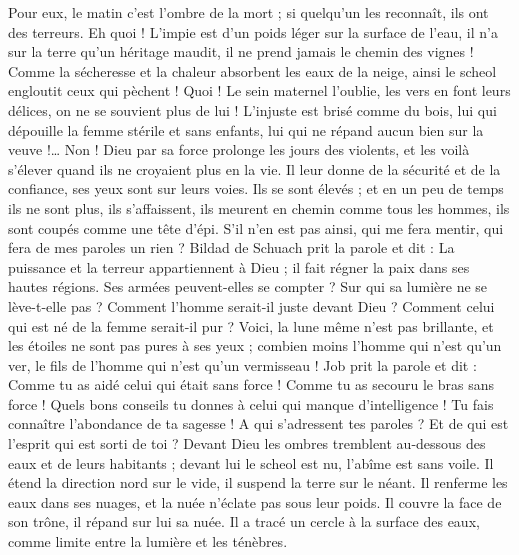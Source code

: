 \begin{multicols}{2}
Pour eux, le matin c'est l'ombre de la mort ; si quelqu'un les reconnaît, ils ont des terreurs.
Eh quoi ! L'impie est d'un poids léger sur la surface de l'eau, il n'a sur la terre qu'un héritage maudit, il ne prend jamais le chemin des vignes !
Comme la sécheresse et la chaleur absorbent les eaux de la neige, ainsi le scheol engloutit ceux qui pèchent !
Quoi ! Le sein maternel l'oublie, les vers en font leurs délices, on ne se souvient plus de lui ! L'injuste est brisé comme du bois,
lui qui dépouille la femme stérile et sans enfants, lui qui ne répand aucun bien sur la veuve !…
Non ! Dieu par sa force prolonge les jours des violents, et les voilà s'élever quand ils ne croyaient plus en la vie.
Il leur donne de la sécurité et de la confiance, ses yeux sont sur leurs voies.
Ils se sont élevés ; et en un peu de temps ils ne sont plus, ils s'affaissent, ils meurent en chemin comme tous les hommes, ils sont coupés comme une tête d'épi.
S'il n'en est pas ainsi, qui me fera mentir, qui fera de mes paroles un rien ?
\VerseOne{}Bildad de Schuach prit la parole et dit :
La puissance et la terreur appartiennent à Dieu ; il fait régner la paix dans ses hautes régions.
Ses armées peuvent-elles se compter ? Sur qui sa lumière ne se lève-t-elle pas ?
Comment l'homme serait-il juste devant Dieu ? Comment celui qui est né de la femme serait-il pur ?
Voici, la lune même n'est pas brillante, et les étoiles ne sont pas pures à ses yeux ;
combien moins l'homme qui n'est qu'un ver, le fils de l'homme qui n'est qu'un vermisseau !
\VerseOne{}Job prit la parole et dit :
Comme tu as aidé celui qui était sans force ! Comme tu as secouru le bras sans force !
Quels bons conseils tu donnes à celui qui manque d'intelligence ! Tu fais connaître l'abondance de ta sagesse !
A qui s'adressent tes paroles ? Et de qui est l'esprit qui est sorti de toi ?
Devant Dieu les ombres tremblent au-dessous des eaux et de leurs habitants ;
devant lui le scheol est nu, l'abîme est sans voile.
Il étend la direction nord sur le vide, il suspend la terre sur le néant.
Il renferme les eaux dans ses nuages, et la nuée n'éclate pas sous leur poids.
Il couvre la face de son trône, il répand sur lui sa nuée.
Il a tracé un cercle à la surface des eaux, comme limite entre la lumière et les ténèbres.

\end{multicols}
